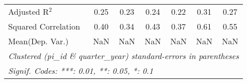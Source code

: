 \begin{tabular}{lcccccc}
   Adjusted R$^2$                                             & 0.25    & 0.23    & 0.24    & 0.22         & 0.31    & 0.27\\  
   Squared Correlation                                        & 0.40    & 0.34    & 0.43    & 0.37         & 0.61    & 0.55\\  
Mean(Dep. Var.) & NaN & NaN & NaN & NaN & NaN & NaN \\
   \midrule \midrule
   \multicolumn{7}{l}{\emph{Clustered (pi\_id \& quarter\_year) standard-errors in parentheses}}\\
   \multicolumn{7}{l}{\emph{Signif. Codes: ***: 0.01, **: 0.05, *: 0.1}}\\
\end{tabular}
\par\endgroup
